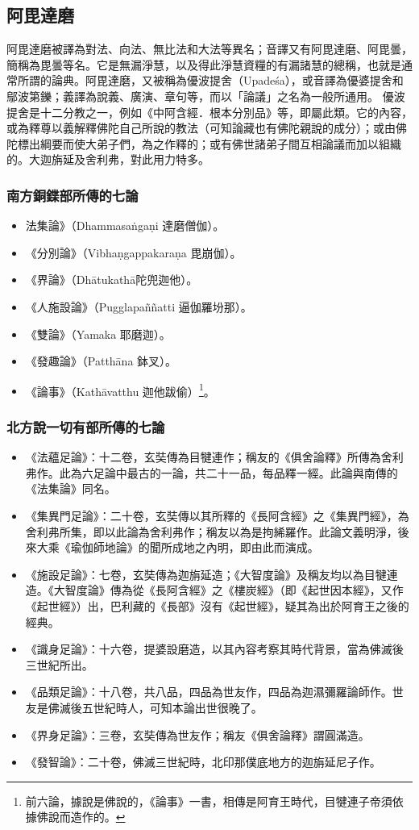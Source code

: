 \subsection{阿毘達磨}
阿毘達磨被譯為對法、向法、無比法和大法等異名；音譯又有阿毘達磨、阿毘曇，簡稱為毘曇等名。它是無漏淨慧，以及得此淨慧資糧的有漏諸慧的總稱，也就是通常所謂的論典。阿毘達磨，又被稱為優波提舍（Upadeśa），或音譯為優婆提舍和鄔波第鑠；義譯為說義、廣演、章句等，而以「論議」之名為一般所通用。
優波提舍是十二分教之一，例如《中阿含經．根本分別品》等，即屬此類。它的內容，或為釋尊以義解釋佛陀自己所說的教法（可知論藏也有佛陀親說的成分）；或由佛陀標出綱要而使大弟子們，為之作釋的；或有佛世諸弟子間互相論議而加以組織的。大迦旃延及舍利弗，對此用力特多。

\subsubsection{南方銅鍱部所傳的七論}
\begin{itemize}
  \item 法集論》（Dhammasaṅgaṇi 達磨僧伽）。
  \item 《分別論》（Vibhaṇgappakaraṇa 毘崩伽）。
  \item 《界論》（Dhātukathā陀兜迦他）。
  \item 《人施設論》（Pugglapaññatti 逼伽羅坋那）。
  \item 《雙論》（Yamaka 耶磨迦）。
  \item 《發趣論》（Patthāna 鉢叉）。
  \item 《論事》（Kathāvatthu 迦他跋偷）\footnote{前六論，據說是佛說的，《論事》一書，相傳是阿育王時代，目犍連子帝須依據佛說而造作的。}。
\end{itemize}

\subsubsection{北方說一切有部所傳的七論}
\begin{itemize}
  \item 《法蘊足論》：十二卷，玄奘傳為目犍連作；稱友的《俱舍論釋》所傳為舍利弗作。此為六足論中最古的一論，共二十一品，每品釋一經。此論與南傳的《法集論》同名。
  \item 《集異門足論》：二十卷，玄奘傳以其所釋的《長阿含經》之《集異門經》，為舍利弗所集，即以此論為舍利弗作；稱友以為是拘絺羅作。此論文義明淨，後來大乘《瑜伽師地論》的聞所成地之內明，即由此而演成。
  \item 《施設足論》：七卷，玄奘傳為迦旃延造；《大智度論》及稱友均以為目犍連造。《大智度論》傳為從《長阿含經》之《樓炭經》（即《起世因本經》，又作《起世經》）出，巴利藏的《長部》沒有《起世經》，疑其為出於阿育王之後的經典。
  \item 《識身足論》：十六卷，提婆設磨造，以其內容考察其時代背景，當為佛滅後三世紀所出。
  \item 《品類足論》：十八卷，共八品，四品為世友作，四品為迦濕彌羅論師作。世友是佛滅後五世紀時人，可知本論出世很晚了。
  \item 《界身足論》：三卷，玄奘傳為世友作；稱友《俱舍論釋》謂圓滿造。
  \item 《發智論》：二十卷，佛滅三世紀時，北印那僕底地方的迦旃延尼子作。
\end{itemize}

